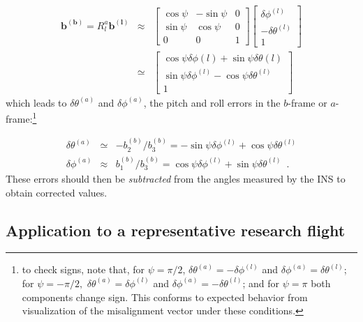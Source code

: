 \documentclass[english,british,amt,bookmarks=false,unicode=true]{copernicus}\usepackage[]{graphicx}\usepackage[]{color}
\begin{document}
\begin{eqnarray}
\mathbf{b^{(b)}=}R_{l}^{a}\mathbf{b^{(l)}} & \approx & \left[\begin{array}{ccc}
\cos\psi & -\sin\psi & 0\\
\sin\psi & \cos\psi & 0\\
0 & 0 & 1
\end{array}\right]\begin{bmatrix}\delta\phi^{(l)}\\
-\delta\theta^{(l)}\\
1
\end{bmatrix}\label{eq:b-vector-in-b-frame}\\
 & \simeq & \begin{bmatrix}\cos\psi\delta\phi(l)+\sin\psi\delta\theta(l)\\
\sin\psi\delta\phi^{(l)}-\cos\psi\delta\theta^{(l)}\\
1
\end{bmatrix}
\end{eqnarray}
which leads to $\delta\theta^{(a)}$ and $\delta\phi^{(a)}$, the
pitch and roll errors in the $b$-frame or $a$-frame:\footnote{to check signs, note that, for $\psi=\pi/2$, $\delta\theta^{(a)}=-\delta\phi^{(l)}$
and $\delta\phi^{(a)}=\delta\theta^{(l)}$; for $\psi=-\pi/2,$ $\delta\theta^{(a)}=\delta\phi^{(l)}$
and $\delta\phi^{(a)}=-\delta\theta^{(l)}$; and for $\psi=\pi$ both
components change sign. This conforms to expected behavior from visualization
of the misalignment vector under these conditions.}

\begin{eqnarray}
\delta\theta^{(a)} & \simeq & -b_{2}^{(b)}/b_{3}^{(b)}=-\sin\psi\delta\phi^{(l)}+\cos\psi\delta\theta^{(l)}\label{eq:final-answer}\\
\delta\phi^{(a)} & \approx & b_{1}^{(b)}/b_{3}^{(b)}=\cos\psi\delta\phi^{(l)}+\sin\psi\delta\theta^{(l)}\,\,\,.\nonumber 
\end{eqnarray}
These errors should then be \emph{subtracted} from the angles measured
by the INS to obtain corrected values. 






\subsection{Application to a representative research flight\label{sub:Application-to-research}}
\end{document}
